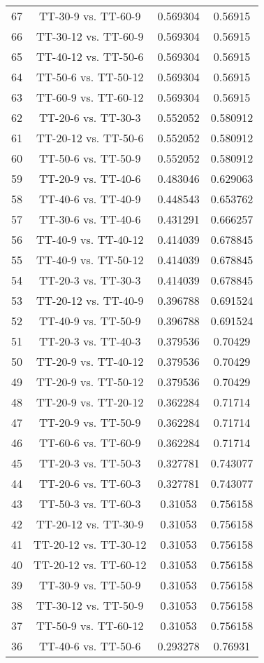\documentclass[a4paper,10pt]{article}
\begin{document}
\begin{landscape}
\begin{table}[!htp]
\begin{tabular}{cccc}
67&TT-30-9 vs. TT-60-9&0.569304&0.56915\\
66&TT-30-12 vs. TT-60-9&0.569304&0.56915\\
65&TT-40-12 vs. TT-50-6&0.569304&0.56915\\
64&TT-50-6 vs. TT-50-12&0.569304&0.56915\\
63&TT-60-9 vs. TT-60-12&0.569304&0.56915\\
62&TT-20-6 vs. TT-30-3&0.552052&0.580912\\
61&TT-20-12 vs. TT-50-6&0.552052&0.580912\\
60&TT-50-6 vs. TT-50-9&0.552052&0.580912\\
59&TT-20-9 vs. TT-40-6&0.483046&0.629063\\
58&TT-40-6 vs. TT-40-9&0.448543&0.653762\\
57&TT-30-6 vs. TT-40-6&0.431291&0.666257\\
56&TT-40-9 vs. TT-40-12&0.414039&0.678845\\
55&TT-40-9 vs. TT-50-12&0.414039&0.678845\\
54&TT-20-3 vs. TT-30-3&0.414039&0.678845\\
53&TT-20-12 vs. TT-40-9&0.396788&0.691524\\
52&TT-40-9 vs. TT-50-9&0.396788&0.691524\\
51&TT-20-3 vs. TT-40-3&0.379536&0.70429\\
50&TT-20-9 vs. TT-40-12&0.379536&0.70429\\
49&TT-20-9 vs. TT-50-12&0.379536&0.70429\\
48&TT-20-9 vs. TT-20-12&0.362284&0.71714\\
47&TT-20-9 vs. TT-50-9&0.362284&0.71714\\
46&TT-60-6 vs. TT-60-9&0.362284&0.71714\\
45&TT-20-3 vs. TT-50-3&0.327781&0.743077\\
44&TT-20-6 vs. TT-60-3&0.327781&0.743077\\
43&TT-50-3 vs. TT-60-3&0.31053&0.756158\\
42&TT-20-12 vs. TT-30-9&0.31053&0.756158\\
41&TT-20-12 vs. TT-30-12&0.31053&0.756158\\
40&TT-20-12 vs. TT-60-12&0.31053&0.756158\\
39&TT-30-9 vs. TT-50-9&0.31053&0.756158\\
38&TT-30-12 vs. TT-50-9&0.31053&0.756158\\
37&TT-50-9 vs. TT-60-12&0.31053&0.756158\\
36&TT-40-6 vs. TT-50-6&0.293278&0.76931\\

\end{tabular}
\end{table}
\end{landscape}
\end{document}
